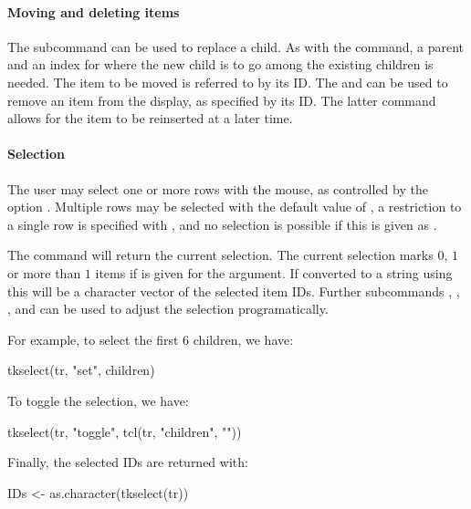 \paragraph{Moving and deleting items}
The  subcommand can be used to replace a
child. As with the  command, a parent and an index for
where the new child is to go among the existing children is needed. The
item to be moved is referred to by its ID. The
 and 
can be used to remove an item from the display, as specified by its
ID. The latter command allows for the item to be reinserted at a later
time.


\paragraph{Selection}
The user may select one or more rows with the mouse, as controlled by
the option . Multiple rows may be
selected with the default value of , a restriction to
a single row is specified with , and no selection is
possible if this is given as .

The  command will return the current
selection. The current selection marks $0$, $1$ or more than $1$ items if
 is given for the  argument.  If
converted to a string using  this will be a
character vector of the selected item IDs. Further subcommands
, , , and  can be used
to adjust the selection programatically.

For example, to select the first 6 children, we have:
\begin{Schunk}
\begin{Sinput}
 tkselect(tr, "set", children)
\end{Sinput}
\end{Schunk}
%
To toggle the selection, we have:
\begin{Schunk}
\begin{Sinput}
 tkselect(tr, "toggle", tcl(tr, "children", ""))
\end{Sinput}
\end{Schunk}
%
Finally, the selected IDs are returned with:
\begin{Schunk}
\begin{Sinput}
 IDs <- as.character(tkselect(tr))
\end{Sinput}
\end{Schunk}

